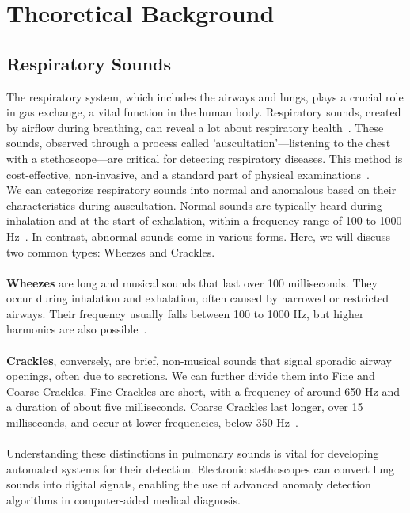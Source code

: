 \cleardoubleoddpage%
\chapter{Theoretical Background}

\section{Respiratory Sounds}
\label{theory:sounds}
The respiratory system, which includes the airways and lungs, plays a crucial role in gas exchange, a vital function in the human body. Respiratory sounds, created by airflow during breathing, can reveal a lot about respiratory health~\cite{earis1992lung}. These sounds, observed through a process called 'auscultation'—listening to the chest with a stethoscope—are critical for detecting respiratory diseases. This method is cost-effective, non-invasive, and a standard part of physical examinations~\cite{bohadana2014fundamentals}.\\
We can categorize respiratory sounds into normal and anomalous based on their characteristics during auscultation. Normal sounds are typically heard during inhalation and at the start of exhalation, within a frequency range of 100 to 1000 Hz~\cite{bohadana2014fundamentals}. In contrast, abnormal sounds come in various forms. Here, we will discuss two common types: Wheezes and Crackles.\\\\
\textbf{Wheezes} are long and musical sounds that last over 100 milliseconds. They occur during inhalation and exhalation, often caused by narrowed or restricted airways. Their frequency usually falls between 100 to 1000 Hz, but higher harmonics are also possible~\cite{bohadana2014fundamentals}.\\\\
\textbf{Crackles}, conversely, are brief, non-musical sounds that signal sporadic airway openings, often due to secretions. We can further divide them into Fine and Coarse Crackles. Fine Crackles are short, with a frequency of around 650 Hz and a duration of about five milliseconds. Coarse Crackles last longer, over 15 milliseconds, and occur at lower frequencies, below 350 Hz~\cite{bohadana2014fundamentals}.\\\\
Understanding these distinctions in pulmonary sounds is vital for developing automated systems for their detection. Electronic stethoscopes can convert lung sounds into digital signals, enabling the use of advanced anomaly detection algorithms in computer-aided medical diagnosis.

